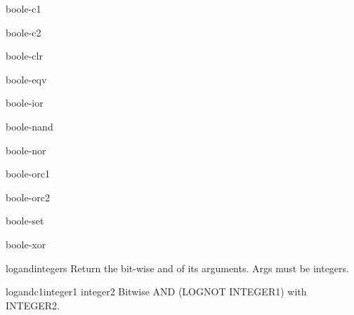 \documentclass[10pt,english]{book}
\begin{document}
\begin{constant}{boole-c1}{}
  
\end{constant}

\begin{constant}{boole-c2}{}
  
\end{constant}

\begin{constant}{boole-clr}{}
  
\end{constant}

\begin{constant}{boole-eqv}{}
  
\end{constant}

\begin{constant}{boole-ior}{}
  
\end{constant}

\begin{constant}{boole-nand}{}
  
\end{constant}

\begin{constant}{boole-nor}{}
  
\end{constant}

\begin{constant}{boole-orc1}{}
  
\end{constant}

\begin{constant}{boole-orc2}{}
  
\end{constant}

\begin{constant}{boole-set}{}
  
\end{constant}

\begin{constant}{boole-xor}{}
  
\end{constant}

\begin{function}{logand}{\rest integers}
  Return the bit-wise and of its arguments. Args must be integers.
\end{function}

\begin{function}{logandc1}{integer1 integer2}
  Bitwise AND (LOGNOT INTEGER1) with INTEGER2.
\end{function}
\end{document}
